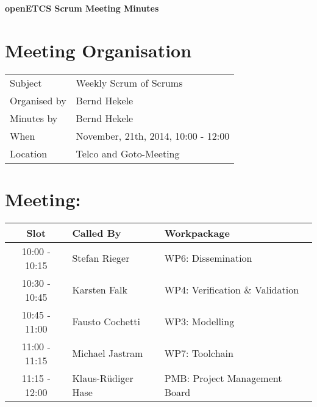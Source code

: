 \documentclass[a4paper, 11pt]{article}
\begin{document}
{\begin{center}\huge\bf openETCS Scrum Meeting Minutes\end{center}}
\section{Meeting Organisation}

\renewcommand{\arraystretch}{1.5}
\begin{supertabular}{m{.2\textwidth}m{.8\textwidth}}
Subject & Weekly Scrum of Scrums\\
Organised by &Bernd Hekele\\
Minutes by & Bernd Hekele\\
When & November, 21th, 2014, 10:00 - 12:00\\
Location & Telco and Goto-Meeting\\
\end{supertabular}

\renewcommand{\arraystretch}{1.0}
\section{Meeting:}

\begin{tabular}{|c|l|l|}
\hline
\textbf{Slot} &  \textbf{Called By} & \textbf{Workpackage} \\
\hline  
10:00 - 10:15 & Stefan Rieger & WP6: Dissemination \\\hline  
10:30 - 10:45 & Karsten Falk & WP4: Verification \& Validation \\\hline  
10:45 - 11:00 & Fausto Cochetti & WP3: Modelling \\\hline  
11:00 - 11:15 & Michael Jastram & WP7: Toolchain \\\hline
11:15 - 12:00 & Klaus-R\"udiger Hase & PMB: Project Management Board \\\hline  
\end{tabular}
\end{document}
